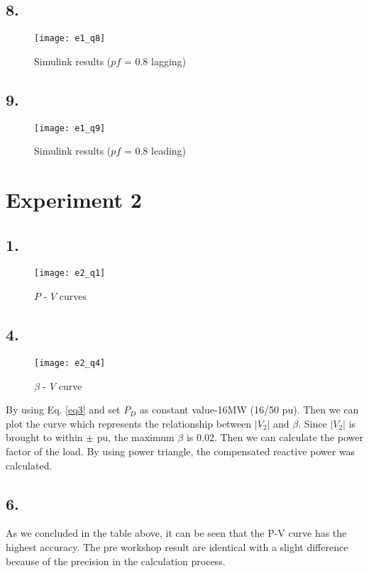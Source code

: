 \documentclass{article}
\begin{document}
\subsection*{8.}
\begin{figure}[H]
\centering
\texttt{[image: e1\_q8]}
\caption{Simulink results ($pf$ = 0.8 lagging)}
\end{figure}

\subsection*{9.}
\begin{figure}[H]
\centering
\texttt{[image: e1\_q9]}
\caption{Simulink results ($pf$ = 0.8 leading)}
\end{figure}


\section*{Experiment 2}

\subsection*{1.}
\begin{figure}[H]
\centering
\texttt{[image: e2\_q1]}
\caption{$P$ - $V$ curves}
\end{figure}

\subsection*{4.}
\begin{figure}[H]
\centering
\texttt{[image: e2\_q4]}
\caption{$\beta$ - $V$ curve}
\end{figure}

By using Eq. \ref{eq3} and set $P_D$ as constant value-16MW (16/50 pu). Then we can plot the curve which represents the relationship between $|V_2|$ and $\beta$. Since $|V_2|$ is brought to within $\pm$ pu, the maximum $\beta$ is 0.02. Then we can calculate the power factor of the load. By using power triangle, the compensated reactive power was calculated.

\subsection*{6.}
As we concluded in the table above, it can be seen that the P-V curve has the highest accuracy. The pre workshop result are identical with a slight difference because of the precision in the calculation process.\\
\end{document}
